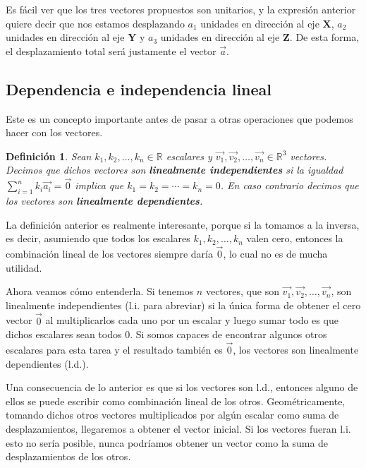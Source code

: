\documentclass[12pt, fleqn]{report}                             %
\newtheorem{Definition}{Definición}[section]                    %
\newcommand{\ve}[1]{\vec{#1}}									%
\begin{document}
			Es fácil ver que los tres vectores propuestos son unitarios, y la expresión anterior quiere decir que nos estamos desplazando $a_1$ unidades en dirección al eje $\mathbf{X}$, $a_2$ unidades en dirección al eje $\mathbf{Y}$ y $a_3$ unidades en dirección al eje $\mathbf{Z}$. De esta forma, el desplazamiento total será justamente el vector $\ve{a}$.
			
			\subsection{Dependencia e independencia lineal}
			
			Este es un concepto importante antes de pasar a otras operaciones que podemos hacer con los vectores.
			
			\begin{Definition}
				Sean $k_1, k_2, \ldots, k_n \in \mathbb{R}$ escalares y $\ve{v_1}, \ve{v_2}, \ldots, \ve{v_n} \in \mathbb{R}^3$ vectores. Decimos que dichos vectores son \textbf{linealmente independientes} si la igualdad $\displaystyle \sum_{i=1}^{n} k_i \ve{a_i} = \ve{0}$ implica que $k_1 = k_2 = \cdots = k_n = 0$. En caso contrario decimos que los vectores son \textbf{linealmente dependientes}.
			\end{Definition}
		
			La definición anterior es realmente interesante, porque si la tomamos a la inversa, es decir, asumiendo que todos los escalares $k_1, k_2, \ldots, k_n$ valen cero, entonces la combinación lineal de los vectores siempre daría $\ve{0}$, lo cual no es de mucha utilidad.
		
			Ahora veamos cómo entenderla. Si tenemos $n$ vectores, que son $\ve{v_1}, \ve{v_2}, \ldots, \ve{v_n}$, son linealmente independientes (l.i. para abreviar) si la única forma de obtener el cero vector $\ve{0}$ al multiplicarlos cada uno por un escalar y luego sumar todo es que dichos escalares sean todos 0. Si somos capaces de encontrar algunos otros escalares para esta tarea y el resultado también es $\ve{0}$, los vectores son linealmente dependientes (l.d.).
			
			Una consecuencia de lo anterior es que si los vectores son l.d., entonces alguno de ellos se puede escribir como combinación lineal de los otros. Geométricamente, tomando dichos otros vectores multiplicados por algún escalar como suma de desplazamientos, llegaremos a obtener el vector inicial. Si los vectores fueran l.i. esto no sería posible, nunca podríamos obtener un vector como la suma de desplazamientos de los otros.
			
\end{document}
